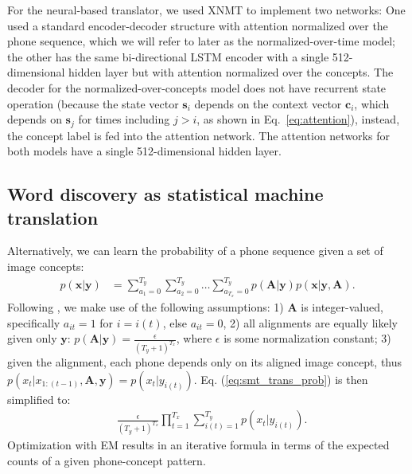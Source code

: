 \documentclass[a4paper]{article}
\begin{document}

For the neural-based translator, we used XNMT \cite{neubig18xnmt} to implement two networks: One used a standard encoder-decoder structure with attention normalized over the phone sequence, which we will refer to later as the normalized-over-time model;
the other has the same bi-directional LSTM encoder with a single 512-dimensional hidden layer but with attention normalized over the concepts.
The decoder for the normalized-over-concepts model does not have recurrent state operation
(because the state vector $\mathbf{s}_i$ depends on the context vector $\mathbf{c}_i$, which depends on
$\mathbf{s}_j$ for times including $j>i$, as shown in Eq.~\ref{eq:attention}),
instead, the concept label is fed into the attention network. The attention networks for both models have a single 512-dimensional hidden layer.

\subsection{Word discovery as statistical machine translation}
Alternatively, we can learn the probability of a phone sequence given a set of image concepts:
\begin{align}\label{eq:smt_trans_prob}
    p(\mathbf{x}|\mathbf y) &= \sum_{a_1 = 0}^{T_y} \sum_{a_2 = 0}^{T_y}\ldots \sum_{a_{T_x} = 0}^{T_y} p(\mathbf{A}|\mathbf y)p(\mathbf x |\mathbf y, \mathbf{A}).
\end{align}
Following \cite{Brown92}, we make use of the following assumptions: 1)
$\mathbf{A}$ is integer-valued, specifically $a_{it}=1$ for $i=i(t)$, else $a_{it}=0$,
2) all alignments are equally likely given only $\mathbf{y}$: $p(\mathbf A|\mathbf y) = \frac{\epsilon}{(T_y+1)^{T_x}}$, where $\epsilon$ is some normalization constant;
3) given the alignment,
each phone depends only on its aligned image concept, thus
$p(x_t|x_{1:(t-1)},\mathbf{A},\mathbf{y})=p(x_t|y_{i(t)})$.
Eq. (\ref{eq:smt_trans_prob}) is then simplified to:
\begin{align}
    &\frac{\epsilon}{(T_y+1)^{T_x}}\prod_{t=1}^{T_x}\sum_{i(t)=1}^{T_y} p(x_t|y_{i(t)}).
\end{align}
Optimization with EM results in 
an iterative formula
 in terms of the expected counts of a given phone-concept pattern.
\end{document}

